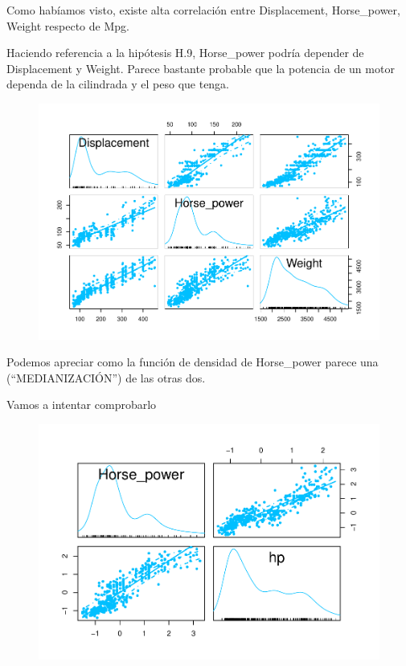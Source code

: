 Como habíamos visto, existe alta correlación entre Displacement, Horse\_power, Weight respecto de Mpg.

\vspace{\baselineskip}

Haciendo referencia a la hipótesis H.9, Horse\_power podría depender de Displacement y Weight. Parece bastante probable que la potencia de un motor dependa de la cilindrada y el peso que tenga.

\begin{figure}[H]\includegraphics[width=.9\linewidth]{img/EDA_files/figure-latex/unnamed-chunk-24-1} \caption{}\end{figure}


Podemos apreciar como la función de densidad de Horse\_power parece una (``MEDIANIZACIÓN'') de las otras dos.


Vamos a intentar comprobarlo

\begin{figure}[H]\includegraphics[width=.9\linewidth]{img/EDA_files/figure-latex/unnamed-chunk-25-1} \caption{}\end{figure}


